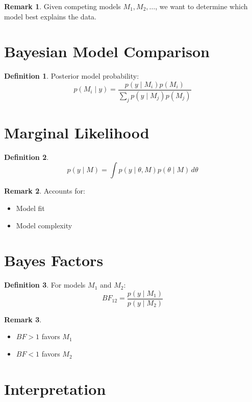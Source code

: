 \documentclass[12pt,oneside]{book}
\numberwithin{equation}{section}
\theoremstyle{definition}
\newtheorem{definition}{Definition}[section]
\newtheorem{remark}{Remark}[section]
\theoremstyle{plain}
\theoremstyle{remark}
\begin{document}
\begin{remark}
Given competing models $M_1, M_2, \dots$, we want to determine which model best explains the data.
\end{remark}

\section{Bayesian Model Comparison}

\begin{definition}
Posterior model probability:
$$
p(M_i \mid y)
=
\frac{p(y \mid M_i) p(M_i)}
{\sum_j p(y \mid M_j) p(M_j)}
$$
\end{definition}

\section{Marginal Likelihood}

\begin{definition}
$$
p(y \mid M)
=
\int p(y \mid \theta, M) p(\theta \mid M)\, d\theta
$$
\end{definition}

\begin{remark}
Accounts for:
\begin{itemize}
\item Model fit
\item Model complexity
\end{itemize}
\end{remark}

\section{Bayes Factors}

\begin{definition}
For models $M_1$ and $M_2$:
$$
BF_{12}
=
\frac{p(y \mid M_1)}{p(y \mid M_2)}
$$
\end{definition}

\begin{remark}
\begin{itemize}
\item $BF > 1$ favors $M_1$
\item $BF < 1$ favors $M_2$
\end{itemize}
\end{remark}

\section{Interpretation}
\end{document}
